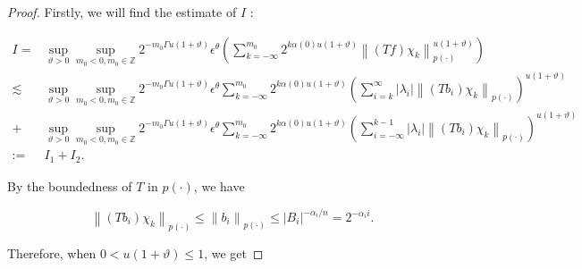 \documentclass[10pt,a4paper]{amsart}
\begin{document}
\begin{proof}
Firstly, we will find the  estimate of $I$ :


\begin{align*}
I= & \sup_{\vartheta>0 }\sup _{m_0<0, m_0\in  \mathbb{Z}} 2^{-m_0\Gamma u(1+\vartheta)} \epsilon  ^\theta \left(\sum_{k=-\infty}^{m_0} 2^{k  \alpha(0) u(1+\vartheta)}\left\|(T f) \chi_{k}\right\|_{{p(\cdot)}}^{u(1+\vartheta)}\right) \\
\lesssim & \sup_{\vartheta>0 }\sup _{m_0<0, m_0\in  \mathbb{Z}} 2^{-m_0\Gamma u(1+\vartheta)} \epsilon  ^\theta\sum_{k=-\infty}^{m_0} 2^{k \alpha(0) u(1+\vartheta)}\left(\sum_{i=k}^{\infty}\left|\lambda_{i}\right|\left\|\left(T b_{i}\right) \chi_{k}\right\|_{{p(\cdot)}}\right)^{u(1+\vartheta)} \\
+& \sup_{\vartheta>0 }\sup _{m_0<0, m_0\in  \mathbb{Z}} 2^{-m_0\Gamma u(1+\vartheta)} \epsilon  ^\theta \sum_{k=-\infty}^{m_0} 2^{k \alpha(0) u(1+\vartheta)}\left(\sum_{i=-\infty}^{k-1}\left|\lambda_{i}\right|\left\|\left(T b_{i}\right) \chi_{k}\right\|_{{p(\cdot)}}\right)^{u(1+\vartheta)} \\
:= & I_{1}+I_{2} . 
\end{align*}


By the boundedness of $T$ in ${p(\cdot)}$, we have


\begin{equation*}
\left\|\left(T b_{i}\right) \chi_{k}\right\|_{{p(\cdot)}} \leq \left\|b_{i}\right\|_{{p(\cdot)}} \leq \left|B_{i}\right|^{-\alpha_{i} / n}=2^{-\alpha_{i} i} . 
\end{equation*}


Therefore, when $0<u(1+\vartheta) \leq  1$, we get



\end{proof}
\end{document}
